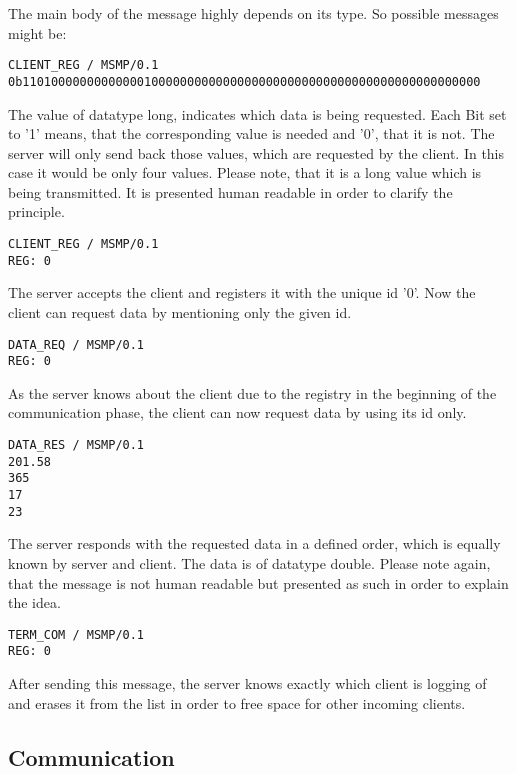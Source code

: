 The main body of the message highly depends on its type. So possible messages might be:
\begin{lstlisting}[caption={client registers to server}, label=lst:msg]
CLIENT_REG / MSMP/0.1
0b1101000000000000010000000000000000000000000000000000000000000000
\end{lstlisting}
The value of datatype long, indicates which data is being requested. Each Bit set to '1' means, that the corresponding value is needed and '0', that it is not. The server will only send back those values, which are requested by the client. In this case it would be only four values. Please note, that it is a long value which is being transmitted. It is presented human readable in order to clarify the principle.\newline
\begin{lstlisting}[caption={server registers client}, label=lst:msg1]
CLIENT_REG / MSMP/0.1
REG: 0
\end{lstlisting}
The server accepts the client and registers it with the unique id '0'. Now the client can request data by mentioning only the given id.\newline
\begin{lstlisting}[caption={client requests data}, label=lst:msg2]
DATA_REQ / MSMP/0.1
REG: 0
\end{lstlisting}
As the server knows about the client due to the registry in the beginning of the communication phase, the client can now request data by using its id only.\newline
\begin{lstlisting}[caption={server responds with needed data}, label=lst:msg3]
DATA_RES / MSMP/0.1
201.58
365
17
23
\end{lstlisting}
The server responds with the requested data in a defined order, which is equally known by server and client. The data is of datatype double. Please note again, that the message is not human readable but presented as such in order to explain the idea.\newline
\begin{lstlisting}[caption={client terminates communication}, label=lst:msg4]
TERM_COM / MSMP/0.1
REG: 0
\end{lstlisting}
After sending this message, the server knows exactly which client is logging of and erases it from the list in order to free space for other incoming clients.

\subsection{Communication}

